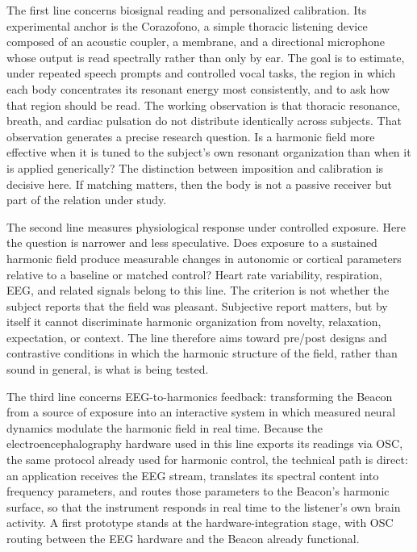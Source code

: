 The first line concerns biosignal reading and personalized calibration. Its experimental anchor is the Corazofono, a simple thoracic listening device composed of an acoustic coupler, a membrane, and a directional microphone whose output is read spectrally rather than only by ear. The goal is to estimate, under repeated speech prompts and controlled vocal tasks, the region in which each body concentrates its resonant energy most consistently, and to ask how that region should be read. The working observation is that thoracic resonance, breath, and cardiac pulsation do not distribute identically across subjects. That observation generates a precise research question. Is a harmonic field more effective when it is tuned to the subject's own resonant organization than when it is applied generically? The distinction between imposition and calibration is decisive here. If matching matters, then the body is not a passive receiver but part of the relation under study.

The second line measures physiological response under controlled exposure. Here the question is narrower and less speculative. Does exposure to a sustained harmonic field produce measurable changes in autonomic or cortical parameters relative to a baseline or matched control? Heart rate variability, respiration, EEG, and related signals belong to this line. The criterion is not whether the subject reports that the field was pleasant. Subjective report matters, but by itself it cannot discriminate harmonic organization from novelty, relaxation, expectation, or context. The line therefore aims toward pre/post designs and contrastive conditions in which the harmonic structure of the field, rather than sound in general, is what is being tested.

The third line concerns EEG-to-harmonics feedback: transforming the Beacon from a source of exposure into an interactive system in which measured neural dynamics modulate the harmonic field in real time. Because the electroencephalography hardware used in this line exports its readings via OSC, the same protocol already used for harmonic control, the technical path is direct: an application receives the EEG stream, translates its spectral content into frequency parameters, and routes those parameters to the Beacon's harmonic surface, so that the instrument responds in real time to the listener's own brain activity. A first prototype stands at the hardware-integration stage, with OSC routing between the EEG hardware and the Beacon already functional.

